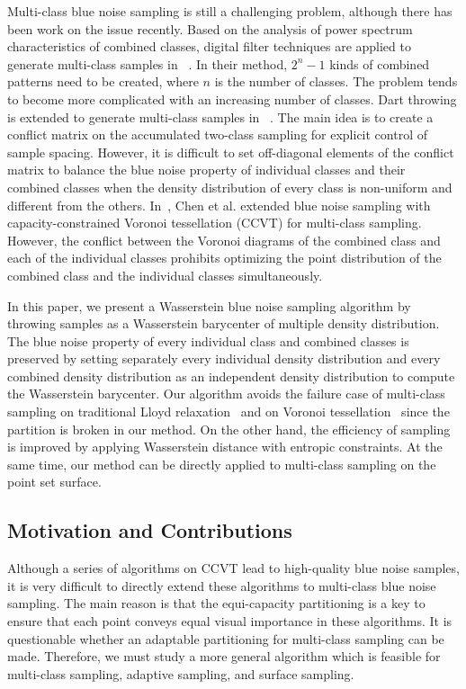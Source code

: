 Multi-class blue noise sampling is still a challenging problem,
although there has been work on the issue recently.
Based on the analysis of power spectrum characteristics of combined classes,
digital filter techniques are applied to generate multi-class samples in ~\cite{Wang:1999:BlueNoise}.
In their method, $2^n-1$ kinds of combined patterns need to be created,
where $n$ is the number of classes.
The problem tends to become more complicated with an increasing number of classes.
Dart throwing is extended to generate multi-class samples in ~\cite{wei:2010:multi}.
The main idea is to create a conflict matrix on the accumulated two-class sampling for explicit control of sample spacing.
However, it is  difficult to set off-diagonal elements of the conflict matrix
to balance the blue noise property of  individual classes and their combined classes
when the density distribution of every class is non-uniform and different from the others.
In~\cite{chen:2012:variational},
Chen et al. extended blue noise sampling with capacity-constrained
Voronoi tessellation (CCVT) for multi-class sampling.
However,
the conflict between the Voronoi diagrams of the combined class and  each of the individual classes
prohibits  optimizing the point distribution of
the combined class and the individual classes simultaneously.


In this paper, we present a Wasserstein blue noise sampling algorithm by
throwing samples as a Wasserstein barycenter of multiple density distribution.
The blue noise property of every individual class and combined classes
 is preserved by setting separately every individual density distribution and every combined density distribution as an independent density distribution to
compute the Wasserstein barycenter.
Our algorithm avoids the failure case of multi-class sampling on traditional Lloyd relaxation~\cite{wei:2010:multi}
 and on Voronoi tessellation~\cite{chen:2012:variational}  since
 the partition is broken in our method.
On the other hand,
the efficiency of sampling is improved by applying Wasserstein distance with entropic constraints.
At the same time,
our method can be directly applied to multi-class sampling on the point set surface.

\subsection{Motivation and Contributions}
Although a series of algorithms on CCVT lead to high-quality blue noise samples,
it is very difficult to directly extend these algorithms to multi-class blue noise sampling.
The main reason is that the equi-capacity partitioning is a key  to
ensure that each point conveys equal visual importance in these algorithms.
It is questionable whether an adaptable partitioning for multi-class sampling can be made.
Therefore, we must study a more general algorithm which is feasible for multi-class sampling,
adaptive sampling, and surface sampling.

